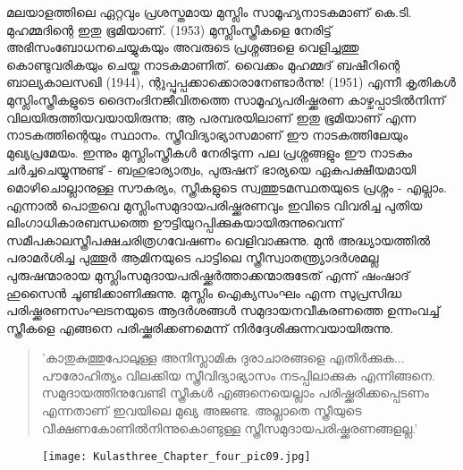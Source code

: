 \label{ch4box4} %
\begin{tcolorbox}[%
 breakable, %
  arc=0mm, 
  left=1pt, right = 1pt, 
  boxrule=0mm,
  colback = {blue!10}, %
] 
\noindent

മലയാളത്തിലെ ഏറ്റവും പ്രശസ്തമായ മുസ്ലിം സാമൂഹ്യനാടകമാണ് കെ.ടി. മുഹമ്മദിന്റെ ഇതു ഭൂമിയാണ്. (1953) മുസ്ലിംസ്ത്രീകളെ നേരിട്ട് അഭിസംബോധനചെയ്യുകയും അവരുടെ പ്രശ്നങ്ങളെ വെളിച്ചത്തു കൊണ്ടുവരികയും ചെയ്ത നാടകമാണിത്. വൈക്കം മുഹമ്മദ് ബഷീറിന്റെ ബാല്യകാലസഖി (1944), ന്റുപ്പുപ്പക്കാക്കൊരാനേണ്ടാർന്നു! (1951) എന്നീ കൃതികൾ മുസ്ലിംസ്ത്രീകളുടെ ദൈനംദിനജീവിതത്തെ സാമൂഹ്യപരിഷ്ക്കരണ കാഴ്ചപ്പാടിൽനിന്ന് വിലയിരുത്തിയവയായിരുന്നു; ആ പരമ്പരയിലാണ് ഇതു ഭൂമിയാണ് എന്ന നാടകത്തിന്റെയും സ്ഥാനം. സ്ത്രീവിദ്യാഭ്യാസമാണ് ഈ നാടകത്തിലേയും മുഖ്യപ്രമേയം. ഇന്നും മുസ്ലിംസ്ത്രീകൾ നേരിടുന്ന പല പ്രശ്നങ്ങളും ഈ നാടകം ചർച്ചചെയ്യുന്നുണ്ട് - ബഹുഭാര്യാത്വം, പുരുഷന് ഭാര്യയെ ഏകപക്ഷീയമായി മൊഴിചൊല്ലാനുള്ള സൗകര്യം, സ്ത്രീകളുടെ സ്വത്തുടമസ്ഥതയുടെ പ്രശ്നം - എല്ലാം. എന്നാൽ പൊതുവെ മുസ്ലിംസമുദായപരിഷ്ക്കരണവും ഇവിടെ വിവരിച്ച പുതിയ ലിംഗാധികാരബന്ധത്തെ ഊട്ടിയുറപ്പിക്കുകയായിരുന്നുവെന്ന് സമീപകാലസ്ത്രീപക്ഷചരിത്രഗവേഷണം വെളിവാക്കുന്നു. മുൻ അദ്ധ്യായത്തിൽ പരാമർശിച്ച പുത്തൂർ ആമിനയുടെ പാട്ടിലെ സ്ത്രീസ്വാതന്ത്ര്യാദർശമല്ല പുരുഷന്മാരായ മുസ്ലിംസമുദായപരിഷ്ക്കർത്താക്കന്മാരുടേത് എന്ന് ഷംഷാദ് ഹുസൈൻ ചൂണ്ടിക്കാണിക്കുന്നു. മുസ്ലിം ഐക്യസംഘം എന്ന സുപ്രസിദ്ധ പരിഷ്ക്കരണസംഘടനയുടെ ആദർശങ്ങൾ സമുദായനവീകരണത്തെ ഉന്നംവച്ച് സ്ത്രീകളെ എങ്ങനെ പരിഷ്ക്കരിക്കണമെന്ന് നിർദ്ദേശിക്കുന്നവയായിരുന്നു. 
\begin{quotation}
\noindent 'കാതുകുത്തുപോലുള്ള അനിസ്ലാമിക ദുരാചാരങ്ങളെ എതിർക്കുക... പൗരോഹിത്യം വിലക്കിയ സ്ത്രീവിദ്യാഭ്യാസം നടപ്പിലാക്കുക എന്നിങ്ങനെ. സമുദായത്തിനുവേണ്ടി സ്ത്രീകൾ എങ്ങനെയെല്ലാം പരിഷ്ക്കരിക്കപ്പെടണം എന്നതാണ് ഇവയിലെ മുഖ്യ അജണ്ട. അല്ലാതെ സ്ത്രീയുടെ വീക്ഷണകോണിൽനിന്നുകൊണ്ടുള്ള സ്ത്രീസമുദായപരിഷ്ക്കരണങ്ങളല്ല.' 
\end{quotation}
\end{tcolorbox}


\begin{figure}[h]
\begin{center}
\texttt{[image: Kulasthree\_Chapter\_four\_pic09.jpg]}
\end{center}
\end{figure}

